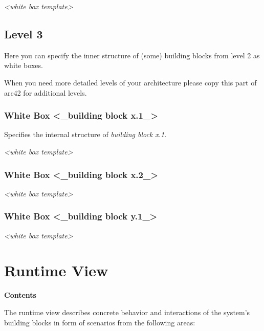 \documentclass[
]{article}
\begin{document}
\emph{\textless white box template\textgreater{}}

\hypertarget{_level_3}{%
\subsection{Level 3}\label{_level_3}}

Here you can specify the inner structure of (some) building blocks from
level 2 as white boxes.

When you need more detailed levels of your architecture please copy this
part of arc42 for additional levels.

\hypertarget{_white_box_building_block_x_1}{%
\subsubsection{White Box \textless\_building block
x.1\_\textgreater{}}\label{_white_box_building_block_x_1}}

Specifies the internal structure of \emph{building block x.1}.

\emph{\textless white box template\textgreater{}}

\hypertarget{_white_box_building_block_x_2}{%
\subsubsection{White Box \textless\_building block
x.2\_\textgreater{}}\label{_white_box_building_block_x_2}}

\emph{\textless white box template\textgreater{}}

\hypertarget{_white_box_building_block_y_1}{%
\subsubsection{White Box \textless\_building block
y.1\_\textgreater{}}\label{_white_box_building_block_y_1}}

\emph{\textless white box template\textgreater{}}

\hypertarget{section-runtime-view}{%
\section{Runtime View}\label{section-runtime-view}}

\textbf{Contents}

The runtime view describes concrete behavior and interactions of the
system's building blocks in form of scenarios from the following areas:
\end{document}
